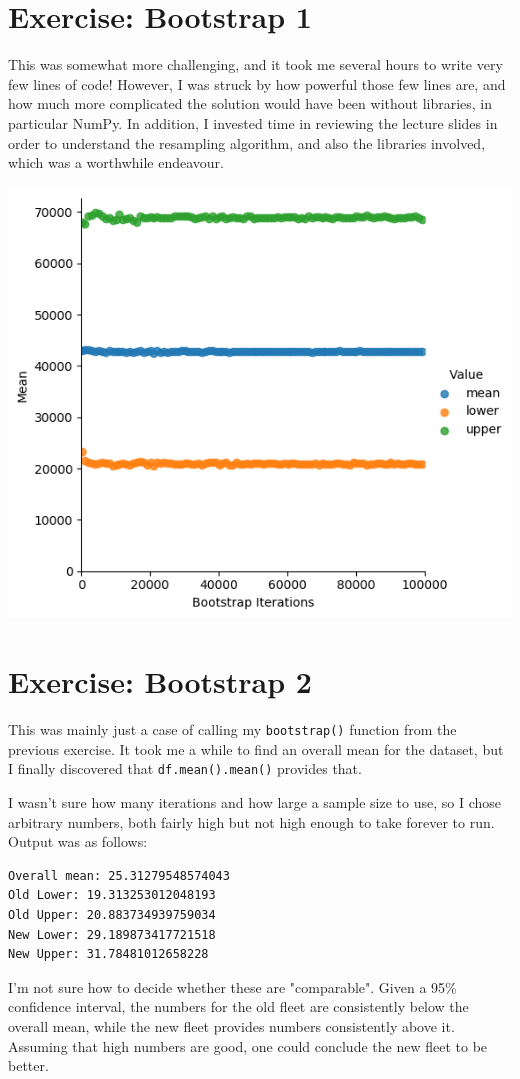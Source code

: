 \documentclass[a4paper]{article}
\begin{document}
\section{Exercise: Bootstrap 1}

This was somewhat more challenging, and it took me several hours to write very few lines of code! However, I was struck by how powerful those few lines are, and how much more complicated the solution would have been without libraries, in particular NumPy. In addition, I invested time in reviewing the lecture slides in order to understand the resampling algorithm, and also the libraries involved, which was a worthwhile endeavour.

\begin{center}
   \includegraphics[scale=0.6]{bootstrap_confidence.png}
\end{center}

\section{Exercise: Bootstrap 2}

This was mainly just a case of calling my \texttt{bootstrap()} function from the previous exercise. It took me a while to find an overall mean for the dataset, but I finally discovered that \texttt{df.mean().mean()} provides that.

I wasn't sure how many iterations and how large a sample size to use, so I chose arbitrary numbers, both fairly high but not high enough to take forever to run. Output was as follows:

\begin{verbatim}
Overall mean: 25.31279548574043
Old Lower: 19.313253012048193
Old Upper: 20.883734939759034
New Lower: 29.189873417721518
New Upper: 31.78481012658228
\end{verbatim}

I'm not sure how to decide whether these are "comparable". Given a 95\% confidence interval, the numbers for the old fleet are consistently below the overall mean, while the new fleet provides numbers consistently above it. Assuming that high numbers are good, one could conclude the new fleet to be better.
\end{document}
